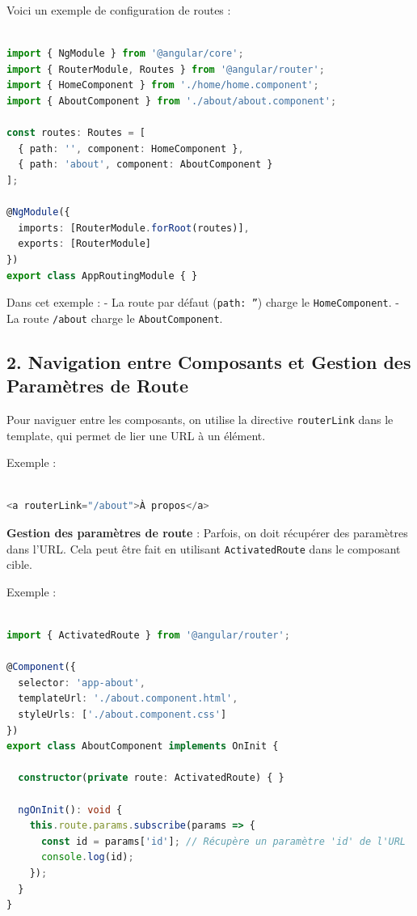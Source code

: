 \documentclass{article}
\begin{document}
Voici un exemple de configuration de routes :
\begin{lstlisting}[language=TypeScript, caption={Using a service in a component}, label={lst:typescript-service-usage}]

import { NgModule } from '@angular/core';
import { RouterModule, Routes } from '@angular/router';
import { HomeComponent } from './home/home.component';
import { AboutComponent } from './about/about.component';

const routes: Routes = [
  { path: '', component: HomeComponent },
  { path: 'about', component: AboutComponent }
];

@NgModule({
  imports: [RouterModule.forRoot(routes)],
  exports: [RouterModule]
})
export class AppRoutingModule { }
\end{lstlisting}

Dans cet exemple :
- La route par défaut (\texttt{path: ''}) charge le \texttt{HomeComponent}.
- La route \texttt{/about} charge le \texttt{AboutComponent}.

\subsection*{2. Navigation entre Composants et Gestion des Paramètres de Route}

Pour naviguer entre les composants, on utilise la directive \texttt{routerLink} dans le template, qui permet de lier une URL à un élément.

Exemple :
\begin{lstlisting}[language=TypeScript, caption={Using a service in a component}, label={lst:typescript-service-usage}]

<a routerLink="/about">À propos</a>
\end{lstlisting}

\textbf{Gestion des paramètres de route} :
Parfois, on doit récupérer des paramètres dans l'URL. Cela peut être fait en utilisant \texttt{ActivatedRoute} dans le composant cible.

Exemple :
\begin{lstlisting}[language=TypeScript, caption={Using a service in a component}, label={lst:typescript-service-usage}]

import { ActivatedRoute } from '@angular/router';

@Component({
  selector: 'app-about',
  templateUrl: './about.component.html',
  styleUrls: ['./about.component.css']
})
export class AboutComponent implements OnInit {

  constructor(private route: ActivatedRoute) { }

  ngOnInit(): void {
    this.route.params.subscribe(params => {
      const id = params['id']; // Récupère un paramètre 'id' de l'URL
      console.log(id);
    });
  }
}
\end{lstlisting}
\end{document}
